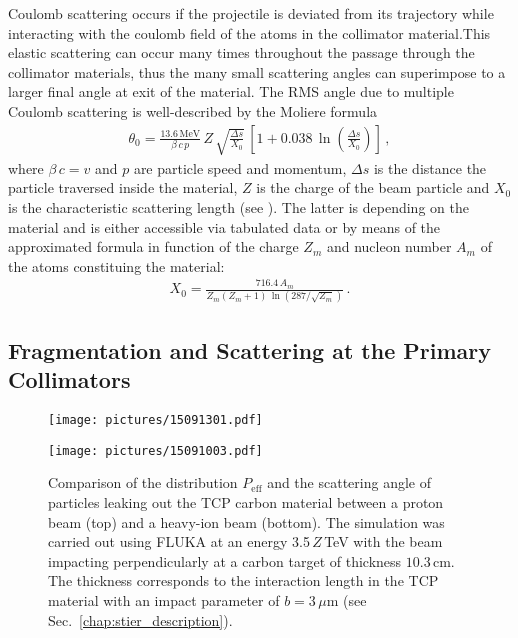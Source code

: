 Coulomb scattering occurs if the projectile is deviated from its trajectory while interacting with the coulomb field of the atoms in the collimator material.This elastic scattering can occur many times throughout the passage through the collimator materials, thus the many small scattering angles can superimpose to a larger final angle at exit of the material. The RMS angle due to multiple Coulomb scattering is well-described by the Moliere formula~\cite{Beringer:1900zz}
\begin{align}
\theta_0 = \frac{13.6\,\text{MeV}}{\beta \, c \, p} \, Z \, \sqrt{\frac{\Delta s}{X_0}} \, \left[ 1 + 0.038 \, \ln \left( \frac{\Delta s}{X_0} \right) \right] \, ,
\end{align}
where $\beta\,c = v$ and $p$ are particle speed and momentum, $\Delta s$ is the distance the particle traversed inside the material, $Z$ is the charge of the beam particle and $X_0$ is the characteristic scattering length (see ). The latter is depending on the material and is either accessible via tabulated data or by means of the approximated formula in function of the charge $Z_m$ and nucleon number $A_m$ of the atoms constituing the material:
\begin{align}
X_0 = \frac{716.4 \, A_m}{Z_m (Z_m+1) \, \ln (287/\sqrt{Z_m})} \, .
\end{align}


\subsection{Fragmentation and Scattering at the Primary Collimators}

 \begin{figure}[b]
 \begin{minipage}[t]{0.5\textwidth}
 \texttt{[image: pictures/15091301.pdf]}
 \end{minipage}
 \begin{minipage}[t]{0.5\textwidth}
 \texttt{[image: pictures/15091003.pdf]}
 \end{minipage}
 \caption{Comparison of the distribution $P_\text{eff}$ and the scattering angle of particles leaking out the TCP carbon material between a proton beam (top) and a heavy-ion beam (bottom). The simulation was carried out using FLUKA at an energy 3.5$\,Z\,$TeV with the beam impacting perpendicularly at a carbon target of thickness $10.3\,$cm. The thickness corresponds to the interaction length in the TCP material with an impact parameter of $b=3\,\mu$m (see Sec.~\ref{chap:stier_description}).} %
 \label{fig:15022301}
 \end{figure}




